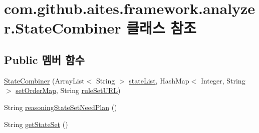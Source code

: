 \hypertarget{classcom_1_1github_1_1aites_1_1framework_1_1analyzer_1_1_state_combiner}{}\section{com.\+github.\+aites.\+framework.\+analyzer.\+State\+Combiner 클래스 참조}
\label{classcom_1_1github_1_1aites_1_1framework_1_1analyzer_1_1_state_combiner}
\subsection*{Public 멤버 함수}
\begin{DoxyCompactItemize}
\item 
\mbox{\hyperlink{classcom_1_1github_1_1aites_1_1framework_1_1analyzer_1_1_state_combiner_abd4a5d9e8f9be68067e183aa30d54a6c}{State\+Combiner}} (Array\+List$<$ String $>$ \mbox{\hyperlink{classcom_1_1github_1_1aites_1_1framework_1_1analyzer_1_1_state_combiner_a1997e445fc92d5f97741d28ff6010299}{state\+List}}, Hash\+Map$<$ Integer, String $>$ \mbox{\hyperlink{classcom_1_1github_1_1aites_1_1framework_1_1analyzer_1_1_state_combiner_abcc50de313d376043ae0b3680e2df001}{set\+Order\+Map}}, String \mbox{\hyperlink{classcom_1_1github_1_1aites_1_1framework_1_1analyzer_1_1_state_combiner_a28a5b0f5141f7dc072500524894d7041}{rule\+Set\+U\+RL}})
\item 
String \mbox{\hyperlink{classcom_1_1github_1_1aites_1_1framework_1_1analyzer_1_1_state_combiner_aec95bd50fb6b328eaa10f37021cbfc48}{reasoning\+State\+Set\+Need\+Plan}} ()
\item 
String \mbox{\hyperlink{classcom_1_1github_1_1aites_1_1framework_1_1analyzer_1_1_state_combiner_a00b6be9a8c91af80dddd1d93bb20d067}{get\+State\+Set}} ()
\end{DoxyCompactItemize}
